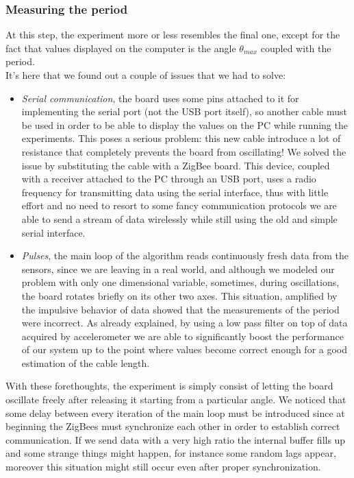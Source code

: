 \subsubsection{Measuring the period}
At this step, the experiment more or less resembles the final one, except for the fact that values displayed on the computer is the angle $\theta_{max}$ coupled with the period. \\
It's here that we found out a couple of issues that we had to solve:
\begin{itemize}
	\item \textit{Serial communication}, the board uses some pins attached to it for implementing the serial port (not the USB port itself), so another cable must be used in order to be able to display the values on the PC while running the experiments. This poses a serious problem: this new cable introduce a lot of resistance that completely prevents the board from oscillating! We solved the issue by substituting the cable with a ZigBee board. This device, coupled with a receiver attached to the PC through an USB port, uses a radio frequency for transmitting data using the serial interface, thus with little effort and no need to resort to some fancy communication protocols we are able to send a stream of data wirelessly while still using the old and simple serial interface.
	\item \textit{Pulses}, the main loop of the algorithm reads continuously fresh data from the sensors, since we are leaving in a real world, and although we modeled our problem with only one dimensional variable, sometimes, during oscillations, the board rotates briefly on its other two axes. This situation, amplified by the impulsive behavior of data showed that the measurements of the period were incorrect. As already explained, by using a low pass filter on top of data acquired by accelerometer we are able to significantly boost the performance of our system up to the point where values become correct enough for a good estimation of the cable length.
\end{itemize}
With these forethoughts, the experiment is simply consist of letting the board oscillate freely after releasing it starting from a particular angle. We noticed that some delay between every iteration of the main loop must be introduced since at beginning the ZigBees must synchronize each other in order to establish correct communication. If we send data with a very high ratio the internal buffer fills up and some strange things might happen, for instance some random lags appear, moreover this situation might still occur even after proper synchronization.
